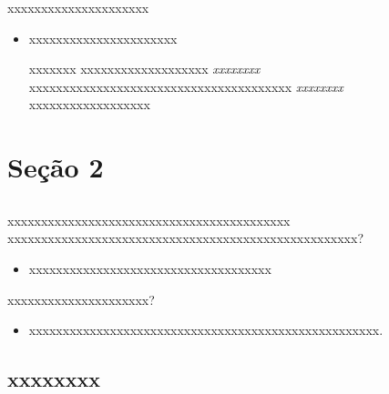 \documentclass[xcolor=x11names,compress]{beamer}
\renewcommand{\(}{\begin{columns}}
\renewcommand{\)}{\end{columns}}
\newcommand{\<}[1]{\begin{column}{#1}}
\renewcommand{\>}{\end{column}}
\begin{document}
\begin{frame}{xxxxxxxxxxxxxxxxxxxxx}
\begin{itemize}
    \item xxxxxxxxxxxxxxxxxxxxxx
    \begin{block}{xxxxxxx}
        xxxxxxxxxxxxxxxxxxx \textit{xxxxxxxx} xxxxxxxxxxxxxxxxxxxxxxxxxxxxxxxxxxxxxxx \textit{xxxxxxxx} xxxxxxxxxxxxxxxxxx
    \end{block}
\end{itemize}
\end{frame}


\section{Seção 2}
\subsection{}

\begin{frame}{xxxxxxxxxxxxxxxxxxxxxxxxxxxxxxxxxxxxxxxxxx}
xxxxxxxxxxxxxxxxxxxxxxxxxxxxxxxxxxxxxxxxxxxxxxxxxxxx?
\begin{itemize}
    \item xxxxxxxxxxxxxxxxxxxxxxxxxxxxxxxxxxxx
\end{itemize}

\pause

xxxxxxxxxxxxxxxxxxxxx?
\begin{itemize}
    \item xxxxxxxxxxxxxxxxxxxxxxxxxxxxxxxxxxxxxxxxxxxxxxxxxxxx.
\end{itemize}
\end{frame}


\subsection{xxxxxxxx}
\end{document}
